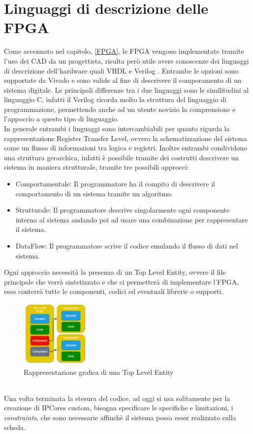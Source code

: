 \section{Linguaggi di descrizione delle FPGA}
Come accennato nel capitolo, \ref{FPGA}, le FPGA vengono implementate tramite l'uso dei CAD da un progettista, risulta però utile avere conoscenze dei linguaggi di descrizione dell'hardware quali VHDL\cite{VHDL} e Verilog\cite{Verilog} . Entrambe le opzioni sono supportate da Vivado e sono valide al fine di descrivere il comporamento di un sistema digitale. Le principali differenze tra i due linguaggi sono le similitudini al linguaggio C, infatti il Verilog ricorda molto la struttura del linguaggio di programmazione, permettendo anche ad un utente novizio la comprensione e l'appoccio a questo tipo di linguaggio.\\
In generale entrambi i linguaggi sono intercambiabili per quanto rigurda la rappresentazione Register Transfer Level, ovvero la schematizzazione del sistema come un flusso di informazioni tra logica e registri. Inoltre entrambi condividono una struttura gerarchica, infatti è possibile tramite dei costrutti descrivere un sistema in maniera strutturale, tramite tre possibili approcci:
\begin{itemize}
    \item Comportamentale: Il programmatore ha il compito di descrivere il comportamento di un sistema tramite un algoritmo.
    \item Strutturale: Il programmatore descrive singolarmente ogni componente interno al sistema andando poi ad usare una combinazione per rappresentare il sistema.
    \item DataFlow: Il programmatore scrive il codice emulando il flusso di dati nel sistema.
\end{itemize}
Ogni approccio necessità la presenza di un Top Level Entity, ovvere il file principale che verrà sintetizzato e che ci permetterà di implementare l'FPGA, esso conterrà tutte le componenti, codici ed eventuali librerie o supporti.
\begin{figure}[h]
\centering
\includegraphics[width=0.3\textwidth]{images/VHFL.jpg}
\caption{Rappresentazione grafica di una Top Level Entity\cite{TesiMattia}}
\end{figure}\\
Una volta terminata la stesura del codice, ad oggi si usa solitamente per la creazione di IPCores custom, bisogna specificare le specifiche e limitazioni, i \textit{constraints}, che sono necessarie affinchè il sistema possa esser realizzato sulla scheda.
